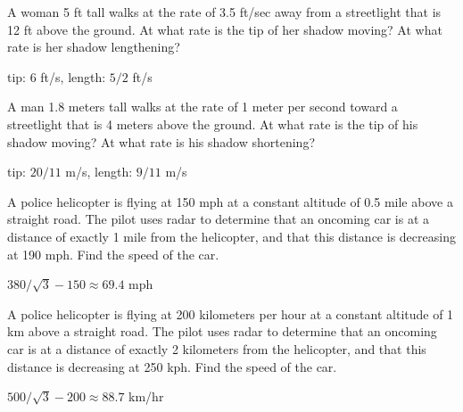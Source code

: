 \begin{exercises}

\begin{exercise}
A woman 5 ft tall walks at the rate of 3.5 ft/sec away from a streetlight
that is 12 ft above the ground.  At what rate is the tip of her shadow
moving?  At what rate is her shadow lengthening?
\begin{answer} tip: 6 ft/s, length: $5/2$ ft/s
\end{answer}\end{exercise}

\begin{exercise} A man 1.8 meters tall walks at the rate of 1 meter per
second toward a streetlight that is 4 meters above the ground.  At
what rate is the tip of his shadow moving?  At what rate is his shadow
shortening?
\begin{answer} tip: $20/11$ m/s, length: $9/11$ m/s
\end{answer}\end{exercise}

\begin{exercise}
A police helicopter is flying at 150 mph at a constant altitude of 0.5 mile
above a straight road.  The pilot uses radar to determine that an oncoming
car is at a distance of exactly 1 mile from the helicopter, and that this
distance is decreasing at 190 mph.  Find the speed of the car.
\begin{answer} $380/\sqrt3-150\approx 69.4$ mph
\end{answer}\end{exercise}

\begin{exercise} A police helicopter is flying at 200 kilometers per hour at
a constant altitude of 1 km above a straight road.  The pilot uses
radar to determine that an oncoming car is at a distance of exactly 2
kilometers from the helicopter, and that this distance is decreasing at 250
kph.  Find the speed of the car.
\begin{answer} $500/\sqrt3-200\approx 88.7$ km/hr
\end{answer}\end{exercise}


\end{exercises}
